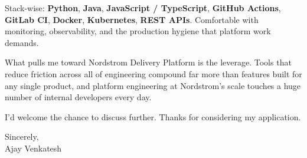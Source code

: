 \documentclass[letterpaper,11pt]{article}
\begin{document}
Stack-wise: \textbf{Python}, \textbf{Java}, \textbf{JavaScript / TypeScript}, \textbf{GitHub Actions}, \textbf{GitLab CI}, \textbf{Docker}, \textbf{Kubernetes}, \textbf{REST APIs}. Comfortable with monitoring, observability, and the production hygiene that platform work demands.

What pulls me toward Nordstrom Delivery Platform is the leverage. Tools that reduce friction across all of engineering compound far more than features built for any single product, and platform engineering at Nordstrom's scale touches a huge number of internal developers every day.

I'd welcome the chance to discuss further. Thanks for considering my application.

\vspace{12pt}
Sincerely, \\
Ajay Venkatesh
\end{document}
